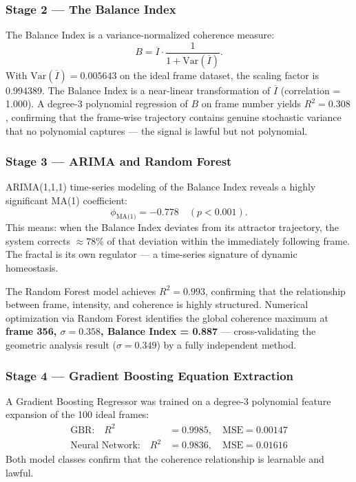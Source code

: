 \documentclass[twocolumn,amsmath,amssymb,prl]{revtex4-2}
\begin{document}
\subsubsection{Stage 2 — The Balance Index}

The Balance Index is a variance-normalized coherence measure:
\begin{equation}
  B = \overline{I} \cdot \frac{1}{1 + \mathrm{Var}(\overline{I})}.
\end{equation}
With $\mathrm{Var}(\overline{I}) = 0.005643$ on the ideal frame dataset, the
scaling factor is 0.994389.  The Balance Index is a near-linear
transformation of $\overline{I}$ (correlation = 1.000).  A degree-3 polynomial
regression of $B$ on frame number yields $R^2 = 0.308$, confirming that the
frame-wise trajectory contains genuine stochastic variance that no polynomial
captures — the signal is lawful but not polynomial.

\subsubsection{Stage 3 — ARIMA and Random Forest}

ARIMA(1,1,1) time-series modeling of the Balance Index reveals a highly
significant MA(1) coefficient:
\begin{equation}
  \phi_{\text{MA(1)}} = -0.778 \quad (p < 0.001).
\end{equation}
This means: when the Balance Index deviates from its attractor trajectory,
the system corrects $\approx 78\%$ of that deviation within the immediately
following frame.  The fractal is its own regulator — a time-series signature
of dynamic homeostasis.

The Random Forest model achieves $R^2 = 0.993$, confirming that the
relationship between frame, intensity, and coherence is highly structured.
Numerical optimization via Random Forest identifies the global coherence
maximum at \textbf{frame 356, $\sigma = 0.358$, Balance Index = 0.887}
— cross-validating the geometric analysis result ($\sigma = 0.349$) by
a fully independent method.

\subsubsection{Stage 4 — Gradient Boosting Equation Extraction}

A Gradient Boosting Regressor was trained on a degree-3 polynomial feature
expansion of the 100 ideal frames:
\begin{align}
  \text{GBR:} \quad R^2 &= 0.9985, \quad \text{MSE} = 0.00147 \\
  \text{Neural Network:} \quad R^2 &= 0.9836, \quad \text{MSE} = 0.01616
\end{align}
Both model classes confirm that the coherence relationship is learnable
and lawful.
\end{document}
